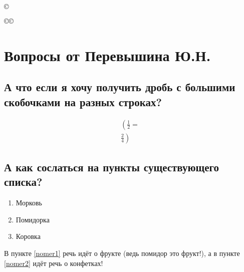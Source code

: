 \documentclass[12pt, a4paper]{article}
\begin{document}
\def \ccc{©}

\newcommand{\сс}{©}

$ \ccc $

\сс   $\сс$

\section{Вопросы от Перевышина Ю.Н.}

\subsection{А что если я хочу получить дробь с большими скобочками на разных строках?}

\begin{align*}
	\left( \frac{1}{2} = \right. \\
	\left. \frac{2}{4} \right)
\end{align*}

\subsection{А как сослаться на пункты существующего списка?}

\begin{enumerate}
\item Морковь
\item Помидорка\label{nomer1}
\item Коровка\label{nomer2}
\end{enumerate}

В пункте \ref{nomer1} речь идёт о фрукте (ведь помидор это фрукт!), а в пункте \ref{nomer2} идёт речь о конфетках!
\end{document}
